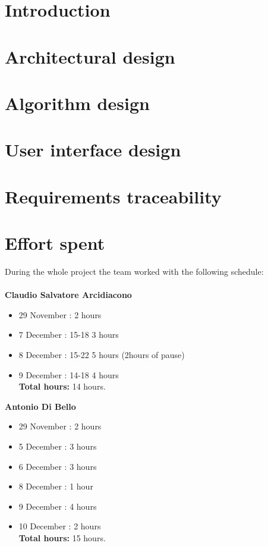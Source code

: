 \documentclass[a4paper]{article}
\begin{document}
\newpage
{}

\tableofcontents

\newpage
\section{Introduction}


\newpage
\section{Architectural design}


\newpage
\section{Algorithm design
}


\newpage
\section{User interface design}


\newpage
\section{Requirements traceability}


\newpage
\section{Effort spent}
During the whole project the team worked with the following schedule:\\ \emph{\\}
\textbf{Claudio Salvatore Arcidiacono}
\begin{itemize}
\item 29 November : 2 hours
\item 7 December : 15-18 3 hours
\item 8 December : 15-22 5 hours (2hours of pause) 
\item 9 December : 14-18 4 hours\\ 

\textbf{Total hours:} 14 hours.
\end{itemize}


\textbf{Antonio Di Bello}
\begin{itemize}
\item 29 November : 2 hours
\item 5 December : 3 hours
\item 6 December : 3 hours
\item 8 December : 1 hour
\item 9 December : 4 hours
\item 10 December : 2 hours \\

\textbf{Total hours:} 15 hours.
\end{itemize}
\end{document}
